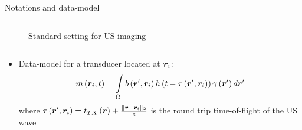 {\begin{block}{Notations and data-model}
\begin{columns}
		\begin{column}{.43\textwidth} %
			\centering
			\begin{figure}
				{\footnotesize
					}
				\caption{Standard setting for US imaging}
			\end{figure}
		\end{column}
	\end{columns} %
	
	\begin{itemize}
		\item Data-model for a transducer located at $\bm{r}_i$:
		\begin{equation}
			m \left(\bm{r}_i, t\right) = \int \limits_{\Omega} b \left(\bm{r}', \bm{r}_i\right) h \left(t - \tau \left(\bm{r}', \bm{r}_i\right)\right) \gamma \left(\bm{r}'\right) d \bm{r}'
		\end{equation}
		where $\tau \left(\bm{r}', \bm{r}_i\right) = t_{TX} \left(\bm{r}\right) + \frac{\| \bm{r} - \bm{r}_i \|_2}{c}$ is the round trip time-of-flight of the US wave 
	\end{itemize}
	
\end{block}
\vfill 


}
